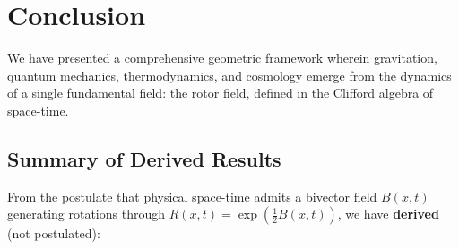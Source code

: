 \documentclass[11pt,a4paper]{article}
\numberwithin{equation}{section}
\theoremstyle{plain}
\theoremstyle{definition}
\theoremstyle{remark}
\begin{document}
\section{Conclusion}
\label{sec:conclusion}

We have presented a comprehensive geometric framework wherein gravitation, quantum mechanics, thermodynamics, and cosmology emerge from the dynamics of a single fundamental field: the rotor field, defined in the Clifford algebra of space-time.

\subsection{Summary of Derived Results}

From the postulate that physical space-time admits a bivector field $B(x,t)$ generating rotations through $R(x,t) = \exp(\frac{1}{2}B(x,t))$, we have \textbf{derived} (not postulated):
\end{document}
